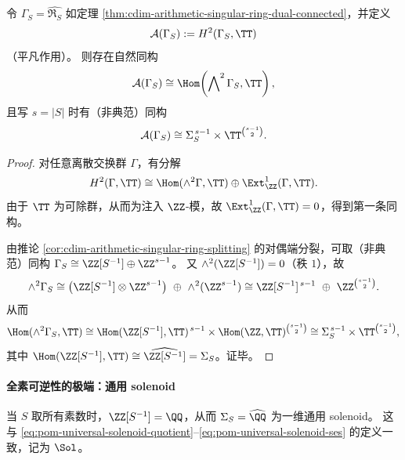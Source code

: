 \begin{theorem}[二阶相位扭结的可解性]\label{thm:cdim-arithmetic-singular-ring-h2}
令 \(\Gamma_S=\widehat{\mathfrak{R}_S}\) 如定理 \ref{thm:cdim-arithmetic-singular-ring-dual-connected}，并定义
\[
\mathcal{A}(\Gamma_S):=H^2(\Gamma_S,\TT)
\]
（平凡作用）。
则存在自然同构
\[
\mathcal{A}(\Gamma_S)\cong \Hom\!\left(\bigwedge\nolimits^2 \Gamma_S,\TT\right),
\]
且写 \(s=|S|\) 时有（非典范）同构
\[
\mathcal{A}(\Gamma_S)\cong \Sigma_S^{\,s-1}\times \TT^{\binom{s-1}{2}}.
\]
\end{theorem}
\begin{proof}
对任意离散交换群 \(\Gamma\)，有分解
\[
H^2(\Gamma,\TT)\cong \Hom(\wedge^2\Gamma,\TT)\oplus \Ext^1_{\ZZ}(\Gamma,\TT).
\]
由于 \(\TT\) 为可除群，从而为注入 \(\ZZ\)-模，故 \(\Ext^1_{\ZZ}(\Gamma,\TT)=0\)，得到第一条同构。
\par
由推论 \ref{cor:cdim-arithmetic-singular-ring-splitting} 的对偶端分裂，可取（非典范）同构
\(
\Gamma_S\cong \ZZ[S^{-1}]\oplus \ZZ^{s-1}
\)。
又 \(\wedge^2(\ZZ[S^{-1}])=0\)（秩 \(1\)），故
\[
\wedge^2\Gamma_S
\cong
\bigl(\ZZ[S^{-1}]\otimes \ZZ^{s-1}\bigr)\ \oplus\ \wedge^2(\ZZ^{s-1})
\cong
\ZZ[S^{-1}]^{\,s-1}\ \oplus\ \ZZ^{\binom{s-1}{2}}.
\]
从而
\[
\Hom(\wedge^2\Gamma_S,\TT)
\cong
\Hom(\ZZ[S^{-1}],\TT)^{\,s-1}\times \Hom(\ZZ,\TT)^{\binom{s-1}{2}}
\cong
\Sigma_S^{\,s-1}\times \TT^{\binom{s-1}{2}},
\]
其中 \(\Hom(\ZZ[S^{-1}],\TT)\cong \widehat{\ZZ[S^{-1}]}=\Sigma_S\)。证毕。
\end{proof}

\paragraph{全素可逆性的极端：通用 solenoid}
当 \(S\) 取所有素数时，\(\ZZ[S^{-1}]=\QQ\)，从而 \(\Sigma_S=\widehat{\QQ}\) 为一维通用 solenoid。
这与 \eqref{eq:pom-universal-solenoid-quotient}--\eqref{eq:pom-universal-solenoid-ses} 的定义一致，记为 \(\Sol\)。

